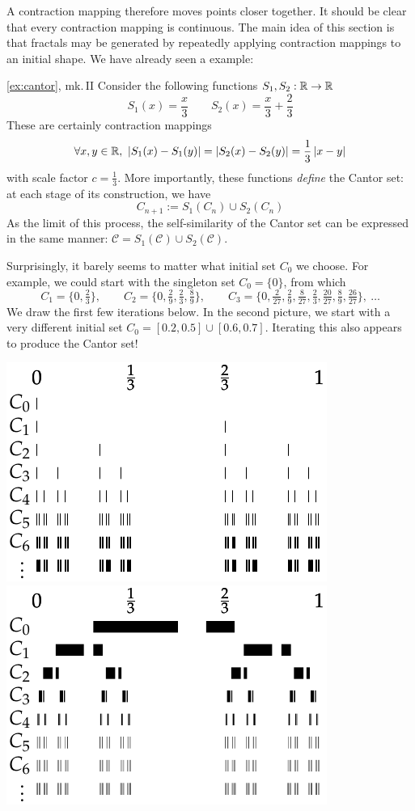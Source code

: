 A contraction mapping therefore moves points closer together. It should be clear that every contraction mapping is continuous. The main idea of this section is that fractals may be generated by repeatedly applying contraction mappings to an initial shape. We have already seen a example:


\begin{example*}{\ref{ex:cantor}, mk.\,II}{}
	Consider the following functions $S_1,S_2:\mathbb{R}\to\mathbb{R}$
	\[
		S_1(x)=\frac x3\qquad S_2(x)=\frac x3+\frac 23
	\]
	These are certainly contraction mappings
	\[
		\forall x,y\in\R,\ \nm{S_1(x)-S_1(y)}=\nm{S_2(x)-S_2(y)}=\frac 13\nm{x-y}
	\]
	with scale factor $c=\frac 13$. More importantly, these functions \emph{define} the Cantor set: at each stage of its construction, we have
	\[
		C_{n+1}:=S_1(C_n)\cup S_2(C_n)
	\]
	As the limit of this process, the self-similarity of the Cantor set can be expressed in the same manner: $\mathcal C=S_1(\mathcal C)\cup S_2(\mathcal C)$.\medbreak
	
	Surprisingly, it barely seems to matter what initial set $C_0$ we choose. For example, we could start with the singleton set $C_0=\{0\}$, from which
	\[
		C_1=\{0,\tfrac 23\},\qquad C_2=\{0,\tfrac 29,\tfrac 23,\tfrac 89\},\qquad C_3=\{0,\tfrac 2{27},\tfrac 29,\tfrac 8{27},\tfrac 23,\tfrac{20}{27},\tfrac 89,\tfrac{26}{27}\},\ \ldots
	\]
	We draw the first few iterations below. In the second picture, we start with a very different initial set $C_0=[0.2,0.5]\cup[0.6,0.7]$. Iterating this also appears to produce the Cantor set!
	\begin{center}
		\includegraphics{cantor-similar3}
		\qquad\qquad
		\includegraphics{cantor-similar2}
	\end{center}
\end{example*}

